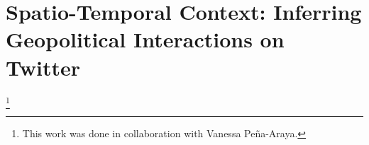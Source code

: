 \chapter{Spatio-Temporal Context: Inferring Geopolitical Interactions on Twitter}\footnote{This work was done in collaboration with Vanessa Pe\~na-Araya.}





